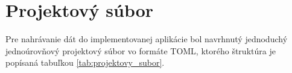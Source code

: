 
%



\chapter{Projektový súbor}
\label{ch:project_file}

Pre nahrávanie dát do implementovanej aplikácie bol navrhnutý jednoduchý jednoúrovňový projektový súbor vo formáte TOML, ktorého štruktúra je popísaná tabuľkou \ref{tab:projektovy_subor}.

